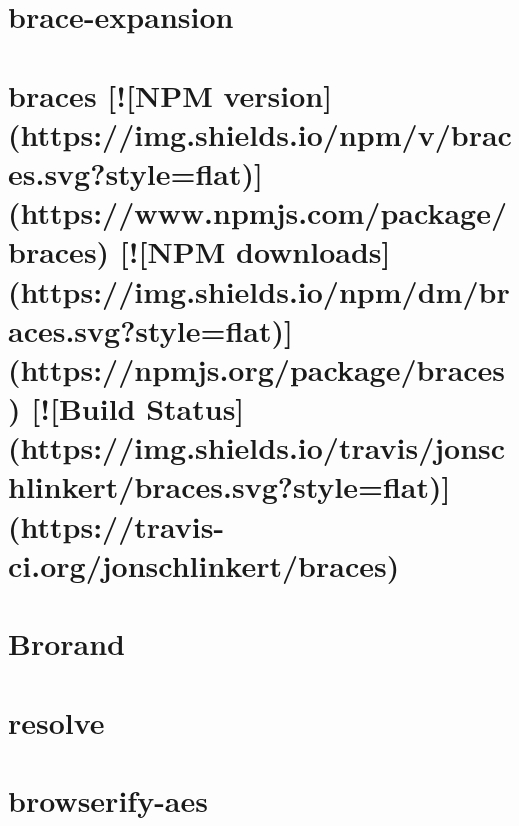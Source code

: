 \documentclass[twoside]{book}
\newcommand{\+}{\discretionary{\mbox{\scriptsize$\hookleftarrow$}}{}{}}
\begin{document}
\chapter{brace-\/expansion}
\label{md__c_1_workspace_demo_src_main_script_node_modules_brace-expansion__r_e_a_d_m_e}

\chapter{braces \mbox{[}!\mbox{[}N\+PM version\mbox{]}(https\+://img.shields.\+io/npm/v/braces.svg?style=flat)\mbox{]}(https\+://www.npmjs.\+com/package/braces) \mbox{[}!\mbox{[}N\+PM downloads\mbox{]}(https\+://img.shields.\+io/npm/dm/braces.svg?style=flat)\mbox{]}(https\+://npmjs.org/package/braces) \mbox{[}!\mbox{[}Build Status\mbox{]}(https\+://img.shields.\+io/travis/jonschlinkert/braces.svg?style=flat)\mbox{]}(https\+://travis-\/ci.org/jonschlinkert/braces)}
\label{md__c_1_workspace_demo_src_main_script_node_modules_braces__r_e_a_d_m_e}

\chapter{Brorand}
\label{md__c_1_workspace_demo_src_main_script_node_modules_brorand__r_e_a_d_m_e}

\chapter{resolve}
\label{md__c_1_workspace_demo_src_main_script_node_modules_browser-resolve_node_modules_resolve_readme}

\chapter{browserify-\/aes}
\label{md__c_1_workspace_demo_src_main_script_node_modules_browserify-aes_readme}

\end{document}
